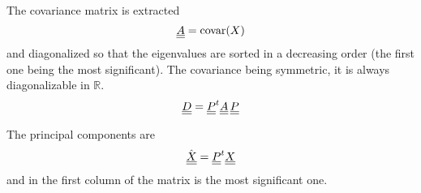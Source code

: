 The covariance matrix is extracted
\begin{equation}
\underline{\underline{A}} = \text{covar}(X) 
\end{equation}
and diagonalized so that the eigenvalues are sorted in a decreasing order (the first one being the most significant). The covariance being symmetric, it is always diagonalizable in $\mathbb{R}$.
\begin{equation}
\underline{\underline{D}} = \underline{\underline{P}}^{t} \underline{\underline{A}} \, \underline{\underline{P}} 
\end{equation}

The principal components are 
\begin{equation}
\hat{\underline{\underline{X}}} = \underline{\underline{P}}^{t} \underline{\underline{X}}
\end{equation}
and in the first column of the matrix is the most significant one.
